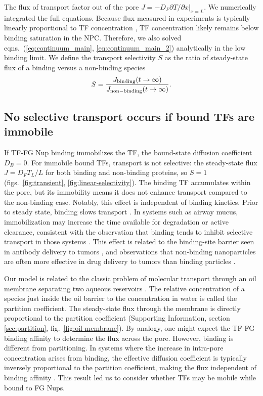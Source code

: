 The flux of transport factor out of the pore
$J = - D_F \left. \partial T/\partial x \right|_{x=L}$. We numerically integrated
the full equations.  Because flux
measured in experiments is typically linearly proportional to TF
concentration \cite{timney06, schmidt15}, TF concentration likely
remains below binding saturation in the NPC. Therefore, we also solved
eqns.~(\ref{eq:continuum_main}, \ref{eq:continuum_main_2})
analytically in the low binding limit.  We define
the transport selectivity $S$ as the ratio of steady-state flux of a
binding versus a non-binding species 
\begin{equation}
  S =  \frac{J_{\rm binding}(t \to \infty)}{J_{\rm non-binding}(t \to \infty)} .
\end{equation}

\subsection*{No selective transport occurs if bound TFs are immobile}
If TF-FG Nup binding immobilizes the TF, the bound-state diffusion
coefficient $D_B = 0$.  For immobile bound TFs, transport is not
selective: the steady-state flux $J = D_F T_L/L $ for both binding and
non-binding proteins, so $S = 1$ (figs.~\ref{fig:transient},
\ref{fig:linear-selectivity}).  The binding TF accumulates within the
pore, but its immobility means it does not enhance transport compared
to the non-binding case.  Notably, this effect is independent of
binding kinetics.  Prior to steady state, binding slows transport
.  In systems such as airway mucus,
immobilization may increase the time available for degradation or
active clearance, consistent with the observation that binding tends
to inhibit selective transport in those systems \cite{schneider17,
  huang17, mastorakos15}.  This effect is related to the binding-site
barrier seen in antibody delivery to tumors \cite{juweid92}, and
observations that non-binding nanoparticles are often more effective
in drug delivery to tumors than binding particles \cite{witten17}.

Our model is related to the classic problem of molecular transport
through an oil membrane separating two aqueous reservoirs
\cite{schafer13}.  The relative concentration of a species just inside
the oil barrier to the concentration in water is called the partition
coefficient.  The steady-state flux through the membrane is directly
proportional to the partition coefficient (Supporting Information,
section \ref{sec:partition}, fig.~\ref{fig:oil-membrane}).  By
analogy, one might expect the TF-FG binding affinity to determine the
flux across the pore. However, binding is different from partitioning.
In systems where the increase in intra-pore concentration arises from
binding, the effective diffusion coefficient is typically inversely
proportional to the partition coefficient, making the flux independent
of binding affinity \cite{bickel02}.  This result led us to consider
whether TFs may be mobile while bound to FG Nups.

